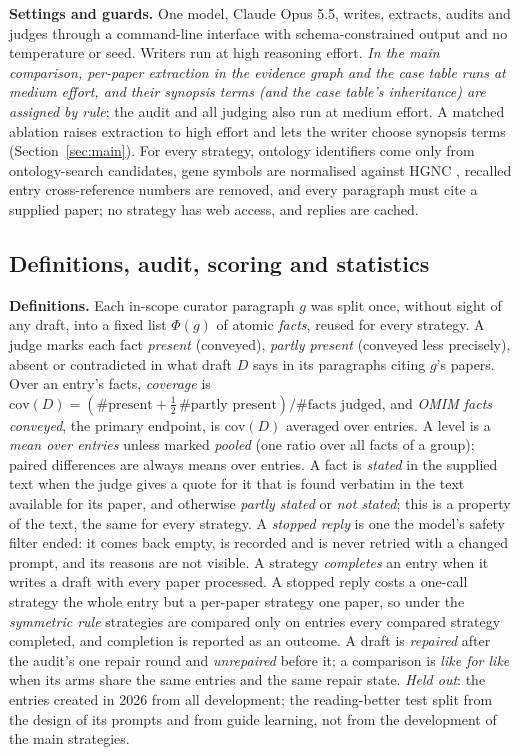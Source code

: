 \documentclass{article} %
\begin{document}
\textbf{Settings and guards.} One model, Claude Opus 5.5, writes, extracts, audits and judges through a command-line interface with schema-constrained output and no temperature or seed. Writers run at high reasoning effort. \emph{In the main comparison, per-paper extraction in the evidence graph and the case table runs at medium effort, and their synopsis terms (and the case table's inheritance) are assigned by rule}; the audit and all judging also run at medium effort. A matched ablation raises extraction to high effort and lets the writer choose synopsis terms (Section~\ref{sec:main}). For every strategy, ontology identifiers come only from ontology-search candidates, gene symbols are normalised against HGNC \citep{seal2023genenames}, recalled entry cross-reference numbers are removed, and every paragraph must cite a supplied paper; no strategy has web access, and replies are cached.

\subsection{Definitions, audit, scoring and statistics}
\label{sec:scoring}
\textbf{Definitions.} Each in-scope curator paragraph $g$ was split once, without sight of any draft, into a fixed list $\Phi(g)$ of atomic \emph{facts}, reused for every strategy. A judge marks each fact \emph{present} (conveyed), \emph{partly present} (conveyed less precisely), absent or contradicted in what draft $D$ says in its paragraphs citing $g$'s papers. Over an entry's facts, \emph{coverage} is $\mathrm{cov}(D)=(\#\text{present}+\tfrac12\,\#\text{partly present})/\#\text{facts judged}$, and \emph{OMIM facts conveyed}, the primary endpoint, is $\mathrm{cov}(D)$ averaged over entries. A level is a \emph{mean over entries} unless marked \emph{pooled} (one ratio over all facts of a group); paired differences are always means over entries. A fact is \emph{stated} in the supplied text when the judge gives a quote for it that is found verbatim in the text available for its paper, and otherwise \emph{partly stated} or \emph{not stated}; this is a property of the text, the same for every strategy. A \emph{stopped reply} is one the model's safety filter ended: it comes back empty, is recorded and is never retried with a changed prompt, and its reasons are not visible. A strategy \emph{completes} an entry when it writes a draft with every paper processed. A stopped reply costs a one-call strategy the whole entry but a per-paper strategy one paper, so under the \emph{symmetric rule} strategies are compared only on entries every compared strategy completed, and completion is reported as an outcome. A draft is \emph{repaired} after the audit's one repair round and \emph{unrepaired} before it; a comparison is \emph{like for like} when its arms share the same entries and the same repair state. \emph{Held out}: the entries created in 2026 from all development; the reading-better test split from the design of its prompts and from guide learning, not from the development of the main strategies.
\end{document}
